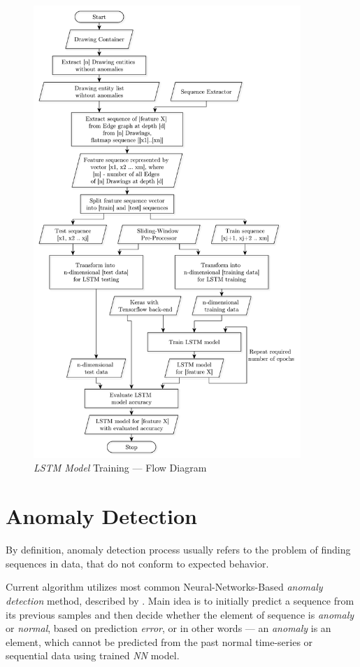 \begin{figure}[htb]
  \centering
    \includegraphics[width=0.90\textwidth]
        {images/anomaly/flow-lstm-training}
    \caption{\textit{LSTM Model} Training --- Flow Diagram}
    \label{flow-lstm-training}
\end{figure}

\section{Anomaly Detection}

By definition, anomaly detection process usually refers to the problem of finding sequences in data, that do not conform to expected behavior. 

Current algorithm utilizes most common Neural-Networks-Based \textit{anomaly detection} method, described by \citet*{chandola2009anomaly}. Main idea is to initially predict a sequence from its previous samples and then decide whether the element of sequence is \textit{anomaly} or \textit{normal}, based on prediction \textit{error}, or in other words --- an \textit{anomaly} is an element, which cannot be predicted from the past normal time-series or sequential data using trained \textit{NN} model. 

